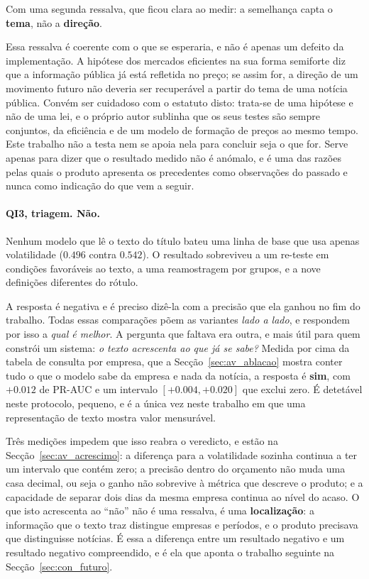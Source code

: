 Com uma segunda ressalva, que ficou clara ao medir: a semelhança capta o \textbf{tema}, não a
\textbf{direção}.

Essa ressalva é coerente com o que se esperaria, e não é apenas um defeito da implementação. A
hipótese dos mercados eficientes na sua forma semiforte \autocite{fama1970efficient} diz que a
informação pública já está refletida no preço; se assim for, a direção de um movimento futuro não
deveria ser recuperável a partir do tema de uma notícia pública. Convém ser cuidadoso com o estatuto
disto: trata-se de uma hipótese e não de uma lei, e o próprio autor sublinha que os seus testes são
sempre conjuntos, da eficiência e de um modelo de formação de preços ao mesmo tempo. Este trabalho
não a testa nem se apoia nela para concluir seja o que for. Serve apenas para dizer que o resultado
medido não é anómalo, e é uma das razões pelas quais o produto apresenta os precedentes como
observações do passado e nunca como indicação do que vem a seguir.

\paragraph{QI3, triagem. Não.}
Nenhum modelo que lê o texto do título bateu uma linha de base que usa apenas volatilidade
($0.496$ contra $0.542$). O resultado sobreviveu a um re-teste em condições favoráveis ao texto, a
uma reamostragem por grupos, e a nove definições diferentes do rótulo.

A resposta é negativa e é preciso dizê-la com a precisão que ela ganhou no fim do trabalho. Todas
essas comparações põem as variantes \emph{lado a lado}, e respondem por isso a \emph{qual é
melhor}. A pergunta que faltava era outra, e mais útil para quem constrói um sistema:
\emph{o texto acrescenta ao que já se sabe?} Medida por cima da tabela de consulta por empresa,
que a Secção~\ref{sec:av_ablacao} mostra conter tudo o que o modelo sabe da empresa e nada da
notícia, a resposta é \textbf{sim}, com $+0.012$ de PR-AUC e um intervalo $[+0.004, +0.020]$ que
exclui zero.
É detetável neste protocolo, pequeno, e é a única vez neste trabalho em que uma representação de texto mostra valor
mensurável.

Três medições impedem que isso reabra o veredicto, e estão na Secção~\ref{sec:av_acrescimo}: a
diferença para a volatilidade sozinha continua a ter um intervalo que contém zero; a precisão
dentro do orçamento não muda uma casa decimal, ou seja o ganho não sobrevive à métrica que
descreve o produto; e a capacidade de separar dois dias da mesma empresa continua ao nível do
acaso. O que isto acrescenta ao ``não'' não é uma ressalva, é uma \textbf{localização}: a
informação que o texto traz distingue empresas e períodos, e o produto precisava que distinguisse
notícias. É essa a diferença entre um resultado negativo e um resultado negativo compreendido, e é
ela que aponta o trabalho seguinte na Secção~\ref{sec:con_futuro}.

